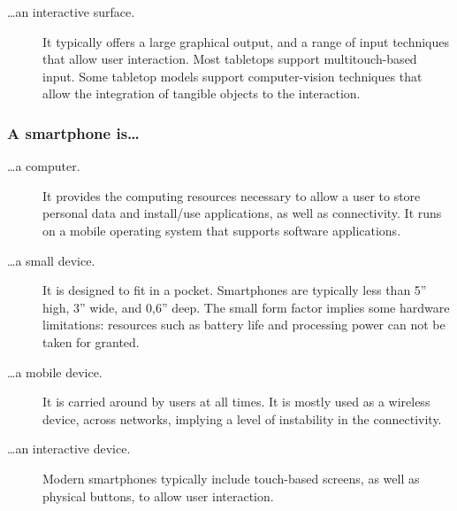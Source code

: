 \begin{description}
\item[\ldots an interactive surface.] 
It typically offers a large graphical output, and a range of input techniques that allow user interaction.
Most tabletops support multitouch-based input.
Some tabletop models support computer-vision techniques that allow the integration of tangible objects to the interaction.

\end{description}

\subsubsection{A smartphone is\ldots}

\begin{description}

\item[\ldots a computer.] 
It provides the computing resources necessary to allow a user to store personal data and install/use applications, as well as connectivity.
It runs on a mobile operating system that supports software applications.

\item[\ldots a small device.] 
It is designed to fit in a pocket.
Smartphones are typically less than 5'' high, 3'' wide, and 0,6'' deep.
The small form factor implies some hardware limitations: resources such as battery life and processing power can not be taken for granted.

\item[\ldots a mobile device.]
It is carried around by users at all times.
It is mostly used as a wireless device, across networks, implying a level of instability in the connectivity.

\item[\ldots an interactive device.]
Modern smartphones typically include touch-based screens, as well as physical buttons, to allow user interaction.

\end{description}

